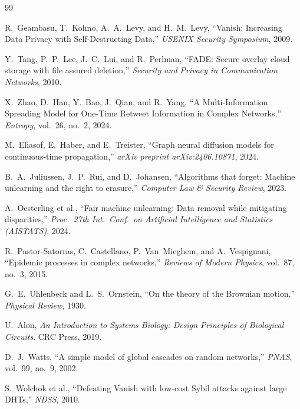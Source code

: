\documentclass[conference]{IEEEtran}
\begin{document}
\begin{thebibliography}{99}

R.~Geambasu, T.~Kohno, A.~A.~Levy, and H.~M.~Levy,
``Vanish: Increasing Data Privacy with Self-Destructing Data,''
\textit{USENIX Security Symposium}, 2009.

Y.~Tang, P.~P.~Lee, J.~C.~Lui, and R.~Perlman,
``FADE: Secure overlay cloud storage with file assured deletion,''
\textit{Security and Privacy in Communication Networks}, 2010.

X.~Zhao, D.~Han, Y.~Bao, J.~Qian, and R.~Yang,
``A Multi-Information Spreading Model for One-Time Retweet Information in Complex
Networks,'' \textit{Entropy}, vol.~26, no.~2, 2024.

M.~Eliasof, E.~Haber, and E.~Treister,
``Graph neural diffusion models for continuous-time propagation,''
\textit{arXiv preprint arXiv:2406.10871}, 2024.

B.~A.~Juliussen, J.~P.~Rui, and D.~Johansen,
``Algorithms that forget: Machine unlearning and the right to erasure,''
\textit{Computer Law \& Security Review}, 2023.

A.~Oesterling et al.,
``Fair machine unlearning: Data removal while mitigating disparities,''
\textit{Proc.\ 27th Int.\ Conf.\ on Artificial Intelligence and Statistics
(AISTATS)}, 2024.

R.~Pastor-Satorras, C.~Castellano, P.~Van~Mieghem, and A.~Vespignani,
``Epidemic processes in complex networks,''
\textit{Reviews of Modern Physics}, vol.~87, no.~3, 2015.

G.~E.~Uhlenbeck and L.~S.~Ornstein,
``On the theory of the Brownian motion,''
\textit{Physical Review}, 1930.

U.~Alon,
\textit{An Introduction to Systems Biology: Design Principles of Biological Circuits}.
CRC Press, 2019.

D.~J.~Watts,
``A simple model of global cascades on random networks,''
\textit{PNAS}, vol.~99, no.~9, 2002.

S.~Wolchok et al.,
``Defeating Vanish with low-cost Sybil attacks against large DHTs,''
\textit{NDSS}, 2010.


\end{thebibliography}
\end{document}
